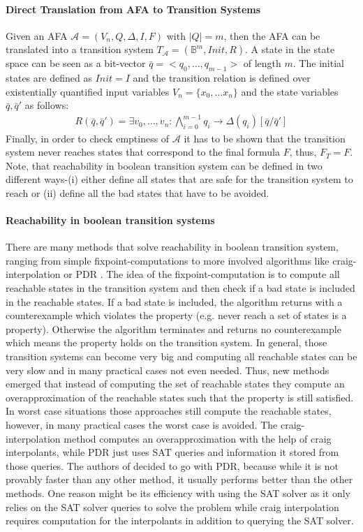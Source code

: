 \paragraph*{Direct Translation from AFA to Transition Systems} Given an AFA $\mathcal{A} = (V_n, Q, \Delta, I, F)$ with $|Q| = m$, then the AFA can be translated into a transition system $T_{\mathcal{A}} = (\mathbb{B}^m, Init, R)$. A state in the state space can be seen as a bit-vector $\bar{q} = <q_0,\dots, q_{m-1}>$ of length $m$.
The initial states are defined as $Init = I$ and the transition relation is defined over existentially quantified input variables $V_n = \{x_0,\dots x_n\}$ and the state variables $\bar{q},\bar{q}'$ as follows:
\begin{align*}
R(\bar{q},\bar{q}') = \exists v_0,\dots, v_n : \bigwedge^{m-1}_{i=0} q_i \rightarrow \Delta(q_i) [\bar{q}/\bar{q}']
\end{align*}
Finally, in order to check emptiness of $\mathcal{A}$ it has to be shown that the transition system never reaches states that correspond to the final formula $F$, thus, $F_T = F$.
Note, that reachability in boolean transition system can be defined in two different ways-(i) either define all states that are safe for the transition system to reach or (ii) define all the bad states that have to be avoided. 

\paragraph*{Reachability in boolean transition systems}
There are many methods that solve reachability in boolean transition system, ranging from simple fixpoint-computations to more involved algorithms like craig-interpolation \cite{??} or PDR \cite{??}.
The idea of the fixpoint-computation is to compute all reachable states in the transition system and then check if a bad state is included in the reachable states.
If a bad state is included, the algorithm returns with a counterexample which violates the property (e.g. never reach a set of states is a property).
Otherwise the algorithm terminates and returns no counterexample which means the property holds on the transition system.
In general, those transition systems can become very big and computing all reachable states can be very slow and in many practical cases not even needed.
Thus, new methods emerged that instead of computing the set of reachable states they compute an overapproximation of the reachable states such that the property is still satisfied.
In worst case situations those approaches still compute the reachable states, however, in many practical cases the worst case is avoided.
The craig-interpolation method computes an overapproximation with the help of craig interpolants, while PDR just uses SAT queries and information it stored from those queries.
The authors of \sloth decided to go with PDR, because while it is not provably faster than any other method, it usually performs better than the other methods.
One reason might be its efficiency with using the SAT solver as it only relies on the SAT solver queries to solve the problem while craig interpolation requires computation for the interpolants in addition to querying the SAT solver.
